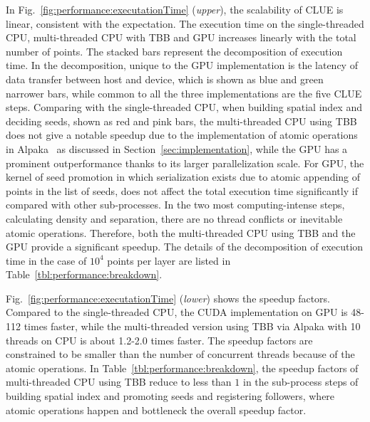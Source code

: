 In Fig.~\ref{fig:performance:executationTime} (\emph{upper}), the scalability of CLUE is linear, consistent with the expectation. The execution time on the single-threaded CPU, multi-threaded CPU with TBB and GPU increases linearly with the total number of points. The stacked bars represent the decomposition of execution time. In the decomposition, unique to the GPU implementation is the latency of data transfer between host and device, which is shown as blue and green narrower bars, while common to all the three implementations are the five CLUE steps. Comparing with the single-threaded CPU, when building spatial index and deciding seeds, shown as red and pink bars, the multi-threaded CPU using TBB does not give a notable speedup due to the implementation of atomic operations in Alpaka~\cite{zenker2016alpaka} as discussed in Section~\ref{sec:implementation}, while the GPU has a prominent outperformance thanks to its larger parallelization scale. For GPU, the kernel of seed promotion in which serialization exists due to atomic appending of points in the list of seeds, does not affect the total execution time significantly if compared with other sub-processes. In the two most computing-intense steps, calculating density and separation, there are no thread conflicts or inevitable atomic operations. Therefore, both the multi-threaded CPU using TBB and the GPU provide a significant speedup. The details of the decomposition of execution time in the case of $10^4$ points per layer are listed in Table~\ref{tbl:performance:breakdown}. 

Fig.~\ref{fig:performance:executationTime} (\emph{lower}) shows the speedup factors. Compared to the single-threaded CPU, the CUDA implementation on GPU is 48-112 times faster, while the multi-threaded version using TBB via Alpaka with 10 threads on CPU is about 1.2-2.0 times faster. The speedup factors are constrained to be smaller than the number of concurrent threads because of the atomic operations. In Table~\ref{tbl:performance:breakdown}, the speedup factors of multi-threaded CPU using TBB reduce to less than $1$ in the sub-process steps of building spatial index and promoting seeds and registering followers, where atomic operations happen and bottleneck the overall speedup factor.
